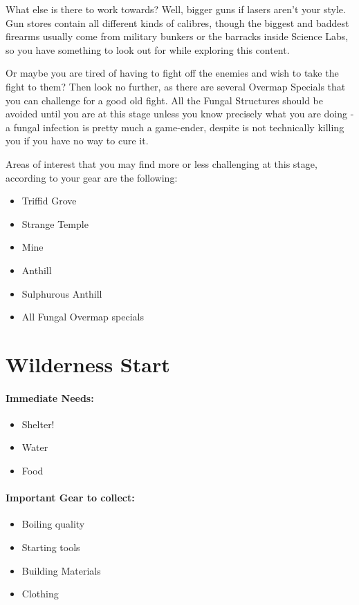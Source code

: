 What else is there to work towards? Well, bigger guns if lasers aren't your style. Gun stores contain all different kinds of calibres, though the biggest and baddest firearms usually come from military bunkers or the barracks inside Science Labs, so you have something to look out for while exploring this content.

Or maybe you are tired of having to fight off the enemies and wish to take the fight to them? Then look no further, as there are several Overmap Specials that you can challenge for a good old fight. All the Fungal Structures should be avoided until you are at this stage unless you know precisely what you are doing - a fungal infection is pretty much a game-ender, despite is not technically killing you if you have no way to cure it.

Areas of interest that you may find more or less challenging at this stage, according to your gear are the following:

\begin{itemize}
\item Triffid Grove
\item Strange Temple
\item Mine
\item Anthill
\item Sulphurous Anthill
\item All Fungal Overmap specials
\end{itemize}

\section{Wilderness Start}

\paragraph{Immediate Needs:}
\begin{itemize}
\item Shelter!
\item Water
\item Food
\end{itemize}

\paragraph{Important Gear to collect:}
\begin{itemize}
\item Boiling quality
\item Starting tools
\item Building Materials
\item Clothing
\end{itemize}

